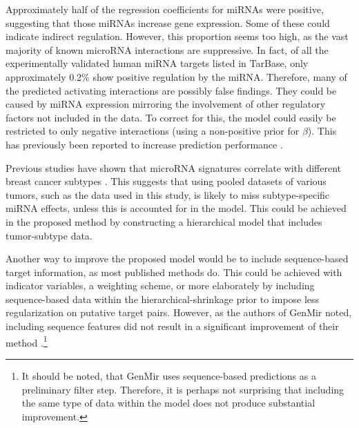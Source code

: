 Approximately half of the regression coefficients for miRNAs were positive,
suggesting that those miRNAs increase gene expression. Some of these
could indicate indirect regulation. However, this proportion seems too
high, as the vast majority of known microRNA interactions are suppressive. In
fact, of all the experimentally validated human miRNA targets listed in
TarBase, only approximately 0.2\% show positive regulation by the miRNA.
Therefore, many of the predicted activating interactions are possibly false
findings. They could be caused by miRNA expression mirroring the involvement of other
regulatory factors not included in the data. To correct for this, the model could
easily be restricted to only negative interactions (using a non-positive prior
for $\beta$). This has previously been reported to increase prediction
performance \citep{Muniategui2013}.

Previous studies have shown that microRNA signatures correlate
with different breast cancer subtypes \citep{Blenkiron2007}. This suggests that
using pooled datasets of various tumors, such as the data used in this
study, is likely to miss subtype-specific miRNA effects, unless this is accounted
for in the model. This could be achieved in the proposed method by
constructing a hierarchical model that includes tumor-subtype data.

Another way to improve the proposed model would be to include sequence-based
target information, as most published methods do. This could be achieved with
indicator variables, a weighting scheme, or more elaborately by including
sequence-based data within the hierarchical-shrinkage prior to impose less
regularization on putative target pairs. However, as the authors of GenMir
noted, including sequence features did not result in a significant improvement
of their method \citep{Huang2008}.\footnote{It should be noted, that GenMir
uses sequence-based predictions as a preliminary filter step. Therefore,
it is perhaps not surprising that including the same type of data within the
model does not produce substantial improvement.}


